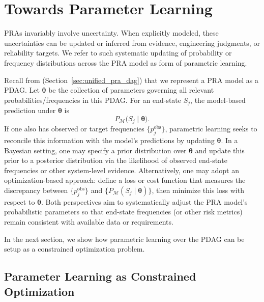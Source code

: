 \chapter{Towards Parameter Learning}
\label{sec:parametric_learning_pra_model}

PRAs invariably involve uncertainty. When explicitly modeled, these uncertainties can be updated or inferred from evidence, engineering judgments, or reliability targets. We refer to such systematic updating of probability or frequency distributions across the PRA model as form of parametric learning.

Recall from (Section~\ref{sec:unified_pra_dag}) that we represent a PRA model as a PDAG. Let \(\boldsymbol{\theta}\) be the collection of parameters governing all relevant probabilities/frequencies in this PDAG. For an end-state \(S_j\), the model-based prediction under \(\boldsymbol{\theta}\) is
\[
P_{\mathcal{M}}\bigl(S_j \mid \boldsymbol{\theta}\bigr).
\]
If one also has observed or target frequencies \(\bigl\{p_{j}^{\mathrm{obs}}\bigr\}\), parametric learning seeks to reconcile this information with the model’s predictions by updating \(\boldsymbol{\theta}\). In a Bayesian setting, one may specify a prior distribution over \(\boldsymbol{\theta}\) and update this prior to a posterior distribution via the likelihood of observed end-state frequencies or other system-level evidence. Alternatively, one may adopt an optimization-based approach: define a loss or cost function that measures the discrepancy between \(\{p_{j}^{\mathrm{obs}}\}\) and \(\{P_{\mathcal{M}}(S_j \mid \boldsymbol{\theta})\}\), then minimize this loss with respect to \(\boldsymbol{\theta}\). Both perspectives aim to systematically adjust the PRA model’s probabilistic parameters so that end-state frequencies (or other risk metrics) remain consistent with available data or requirements. 

In the next section, we show how parametric learning over the PDAG can be setup as a constrained optimization problem.

\section{Parameter Learning as Constrained Optimization}
\label{sec:opt_formalization}

